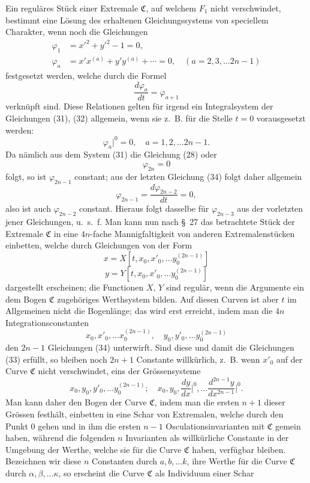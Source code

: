 \documentclass[11pt,a4paper,leqno]{article}
\begin{document}
Ein reguläres Stück einer Extremale $\mathfrak C$, auf welchem $F_1$ nicht verschwindet, bestimmt eine Lösung des erhaltenen Gleichungssystems von speciellem Charakter, wenn noch die Gleichungen
\begin{equation}\tag{33}
\begin{aligned}
\varphi_1&=x'^2+y'^2-1=0,\\
\varphi_a&=x'x^{(a)}+y'y^{(a)}+\cdots=0,\quad (a=2,3,\ldots 2n-1)
\end{aligned}
\end{equation}
festgesetzt werden, welche durch die Formel
\[
\frac{d\varphi_a}{dt}=\varphi_{a+1}
\]
verknüpft sind. Diese Relationen gelten für irgend ein Integralsystem der Gleichungen (31), (32) allgemein, wenn sie z.~B. für die Stelle $t=0$ vorausgesetzt werden:
\begin{equation}\tag{34}
\varphi_a\bigg|^0=0,\quad a=1,2,\ldots 2n-1.
\end{equation}
Da nämlich aus dem System (31) die Gleichung (28) oder
\[
\varphi_{2n}=0
\]
folgt, so ist $\varphi_{2n-1}$ constant; aus der letzten Gleichung (34) folgt daher allgemein
\[
\varphi_{2n-1}=\frac{d\varphi_{2n-2}}{dt}=0,
\]
also ist auch $\varphi_{2n-2}$ constant. Hieraus folgt dasselbe für $\varphi_{2n-3}$ aus der vorletzten jener Gleichungen, u.~s.~f. Man kann nun nach \S~27 das betrachtete Stück der Extremale $\mathfrak C$ in eine $4n$-fache Mannigfaltigkeit von anderen Extremalenstücken einbetten, welche durch Gleichungen von der Form
\[
x=X[t,x_0,x'_0,\ldots y_0^{(2n-1)}]
\]
\[
y=Y[t,x_0,x'_0,\ldots y_0^{(2n-1)}]
\]
dargestellt erscheinen; die Functionen $X$, $Y$ sind regulär, wenn die Argumente ein dem Bogen $\mathfrak C$ zugehöriges Werthsystem bilden. Auf diesen Curven ist aber $t$ im Allgemeinen nicht die Bogenlänge; das wird erst erreicht, indem man die $4n$ Integrationsconstanten
\[
x_0,x'_0,\ldots x_0^{(2n-1)},\quad y_0,y'_0,\ldots y_0^{(2n-1)}
\]
den $2n-1$ Gleichungen (34) unterwirft. Sind diese und damit die Gleichungen (33) erfüllt, so bleiben noch $2n+1$ Constante
willkürlich, z.~B. wenn $x'_0$ auf der Curve $\mathfrak C$ nicht verschwindet, eins der Grössensysteme
\[
x_0,y_0,y'_0,\ldots y_0^{(2n-1)};\quad
x_0,y_0,\frac{dy}{dx}\bigg|^0,\ldots \frac{d^{2n-1}y}{dx^{2n-1}}\bigg|^0.
\]
Man kann daher den Bogen der Curve $\mathfrak C$, indem man die ersten $n+1$ dieser Grössen festhält, einbetten in eine Schar von Extremalen, welche durch den Punkt 0 gehen und in ihm die ersten $n-1$ Osculationsinvarianten mit $\mathfrak C$ gemein haben, während die folgenden $n$ Invarianten als willkürliche Constante in der Umgebung der Werthe, welche sie für die Curve $\mathfrak C$ haben, verfügbar bleiben. Bezeichnen wir diese $n$ Constanten durch $a,b,\ldots k$, ihre Werthe für die Curve $\mathfrak C$ durch $\alpha,\beta,\ldots\kappa$, so erscheint die Curve $\mathfrak C$ als Individuum einer Schar
\end{document}
